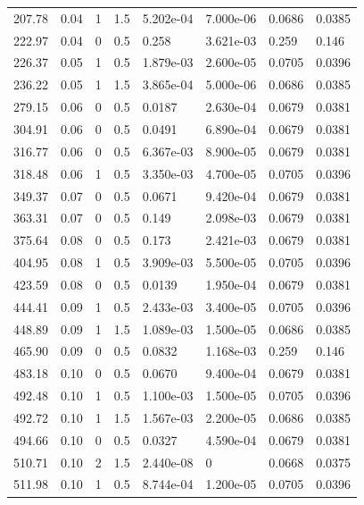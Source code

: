 \documentclass[preview]{standalone}
\begin{document}
{{\begin{tabular}{L{1.2cm}C{1.2cm} C{0.3cm}C{0.5cm} C{1.4cm}C{1.4cm} C{1.4cm}C{1.4cm}}
  207.78  &  0.04  & 1     & 1.5 &  5.202e-04  & 7.000e-06  & 0.0686 &  0.0385   \\ 
  222.97  &  0.04  & 0     & 0.5 &  0.258  & 3.621e-03  & 0.259 &  0.146   \\ 
  226.37  &  0.05  & 1     & 0.5 &  1.879e-03  & 2.600e-05  & 0.0705 &  0.0396   \\ 
  236.22  &  0.05  & 1     & 1.5 &  3.865e-04  & 5.000e-06  & 0.0686 &  0.0385   \\ 
  279.15  &  0.06  & 0     & 0.5 &  0.0187  & 2.630e-04  & 0.0679 &  0.0381   \\ 
  304.91  &  0.06  & 0     & 0.5 &  0.0491  & 6.890e-04  & 0.0679 &  0.0381   \\ 
  316.77  &  0.06  & 0     & 0.5 &  6.367e-03  & 8.900e-05  & 0.0679 &  0.0381   \\ 
  318.48  &  0.06  & 1     & 0.5 &  3.350e-03  & 4.700e-05  & 0.0705 &  0.0396   \\ 
  349.37  &  0.07  & 0     & 0.5 &  0.0671  & 9.420e-04  & 0.0679 &  0.0381   \\ 
  363.31  &  0.07  & 0     & 0.5 &  0.149  & 2.098e-03  & 0.0679 &  0.0381   \\ 
  375.64  &  0.08  & 0     & 0.5 &  0.173  & 2.421e-03  & 0.0679 &  0.0381   \\ 
  404.95  &  0.08  & 1     & 0.5 &  3.909e-03  & 5.500e-05  & 0.0705 &  0.0396   \\ 
  423.59  &  0.08  & 0     & 0.5 &  0.0139  & 1.950e-04  & 0.0679 &  0.0381   \\ 
  444.41  &  0.09  & 1     & 0.5 &  2.433e-03  & 3.400e-05  & 0.0705 &  0.0396   \\ 
  448.89  &  0.09  & 1     & 1.5 &  1.089e-03  & 1.500e-05  & 0.0686 &  0.0385   \\ 
  465.90  &  0.09  & 0     & 0.5 &  0.0832  & 1.168e-03  & 0.259 &  0.146   \\ 
  483.18  &  0.10  & 0     & 0.5 &  0.0670  & 9.400e-04  & 0.0679 &  0.0381   \\ 
  492.48  &  0.10  & 1     & 0.5 &  1.100e-03  & 1.500e-05  & 0.0705 &  0.0396   \\ 
  492.72  &  0.10  & 1     & 1.5 &  1.567e-03  & 2.200e-05  & 0.0686 &  0.0385   \\ 
  494.66  &  0.10  & 0     & 0.5 &  0.0327  & 4.590e-04  & 0.0679 &  0.0381   \\ 
  510.71  &  0.10  & 2     & 1.5 &  2.440e-08  & 0  & 0.0668 &  0.0375   \\ 
  511.98  &  0.10  & 1     & 0.5 &  8.744e-04  & 1.200e-05  & 0.0705 &  0.0396   \\ 

\end{tabular}}}
\end{document}
